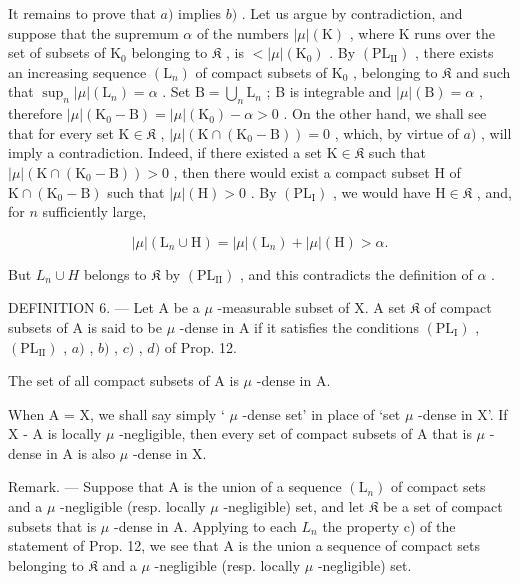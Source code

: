 It remains to prove that \(a)\) implies \(b)\) . Let us argue by contradiction, and suppose that the supremum \(\alpha\) of the numbers \(|\mu|(\mathrm{K})\) , where K runs over the set of subsets of \(\mathrm{K}_0\) belonging to \(\mathfrak{K}\) , is \(< |\mu|(\mathrm{K}_0)\) . By \((\mathrm{PL}_{\mathrm{II}})\) , there exists an increasing sequence \((\mathrm{L}_n)\) of compact subsets of \(\mathrm{K}_0\) , belonging to \(\mathfrak{K}\) and such that \(\sup_n |\mu|(\mathrm{L}_n) = \alpha\) . Set \(\mathrm{B} = \bigcup_n \mathrm{L}_n\) ; B is integrable and \(|\mu|(\mathrm{B}) = \alpha\) , therefore \(|\mu|(\mathrm{K}_0 - \mathrm{B}) = |\mu|(\mathrm{K}_0) - \alpha > 0\) . On the other hand, we shall see that for every set \(\mathrm{K} \in \mathfrak{K}\) , \(|\mu|(\mathrm{K} \cap (\mathrm{K}_0 - \mathrm{B})) = 0\) , which, by virtue of \(a)\) , will imply a contradiction. Indeed, if there existed a set \(\mathrm{K} \in \mathfrak{K}\) such that \(|\mu|(\mathrm{K} \cap (\mathrm{K}_0 - \mathrm{B})) > 0\) , then there would exist a compact subset H of \(\mathrm{K} \cap (\mathrm{K}_0 - \mathrm{B})\) such that \(|\mu|(\mathrm{H}) > 0\) . By \((\mathrm{PL}_{\mathrm{I}})\) , we would have \(\mathrm{H} \in \mathfrak{K}\) , and, for \(n\) sufficiently large,

\[
| \mu | (\mathrm{L} _ {n} \cup \mathrm{H}) = | \mu | (\mathrm{L} _ {n}) + | \mu | (\mathrm{H}) > \alpha .
\]

But \(L_{n} \cup H\) belongs to \(\mathfrak{K}\) by \((\mathrm{PL}_{\mathrm{II}})\) , and this contradicts the definition of \(\alpha\) .

DEFINITION 6. --- Let A be a \(\mu\) -measurable subset of X. A set \(\mathfrak{K}\) of compact subsets of A is said to be \(\mu\) -dense in A if it satisfies the conditions \((\mathrm{PL}_{\mathrm{I}})\) , \((\mathrm{PL}_{\mathrm{II}})\) , \(a)\) , \(b)\) , \(c)\) , \(d)\) of Prop. 12.

The set of all compact subsets of A is \(\mu\) -dense in A.

When A = X, we shall say simply ` \(\mu\) -dense set' in place of `set \(\mu\) -dense in X'. If X - A is locally \(\mu\) -negligible, then every set of compact subsets of A that is \(\mu\) -dense in A is also \(\mu\) -dense in X.

Remark. --- Suppose that A is the union of a sequence \((\mathrm{L}_{n})\) of compact sets and a \(\mu\) -negligible (resp. locally \(\mu\) -negligible) set, and let \(\mathfrak{K}\) be a set of compact subsets that is \(\mu\) -dense in A. Applying to each \(L_{n}\) the property c) of the statement of Prop. 12, we see that A is the union a sequence of compact sets belonging to \(\mathfrak{K}\) and a \(\mu\) -negligible (resp. locally \(\mu\) -negligible) set.

